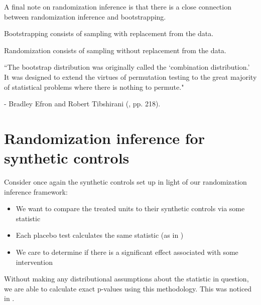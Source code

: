 \documentclass[notes,11pt, aspectratio=169]{beamer}
\newenvironment{wideitemize}{\itemize\addtolength{\itemsep}{10pt}}{\enditemize}
\begin{document}
\begin{frame}{}
A final note on randomization inference is that there is a close connection between
randomization inference and bootstrapping.

\medskip
\begin{wideitemize}
    \item Bootstrapping consists of sampling with replacement from the data.
    \item Randomization consists of sampling without replacement from the data.
\end{wideitemize}

\begin{block}{}
    ``The bootstrap distribution was originally called the `combination distribution.' It was designed to extend the virtues of permutation testing to the
    great majority of statistical problems where there is nothing to permute."
\end{block}
\begin{flushright}
    - Bradley Efron and Robert Tibshirani (\citeyear{efron_introduction_1993}, pp. 218).
\end{flushright}

\end{frame}



\section{Randomization inference for synthetic controls}

\begin{frame}{}

        Consider once again the synthetic controls set up in light of our randomization inference framework:
        \pause
        \medskip
        
        \begin{itemize}
            \item We want to compare the treated units to their synthetic controls via some statistic \pause
            \item Each placebo test calculates the same statistic (as in \cite{abadie_economic_2003}) \pause
            \item We care to determine if there is a significant effect associated with some intervention \pause
        \end{itemize}
    
        \medskip
    
        Without making any distributional assumptions about the statistic in question, we are able to
        calculate exact p-values using this methodology. This was noticed in \cite{abadie_synthetic_2010}.
    
\end{frame}
\end{document}
